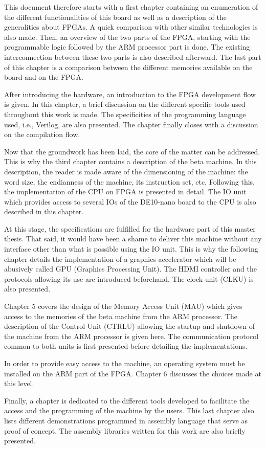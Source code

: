 This document therefore starts with a first chapter containing an enumeration of the different 
functionalities of this board as well as a description of the generalities about FPGAs. A quick 
comparison with other similar technologies is also made. Then, an overview of the two parts of the 
FPGA, starting with the programmable logic followed by the ARM processor part is done. The existing 
interconnection between these two parts is also described afterward. The last part of this chapter 
is a comparison between the different memories available on the board and on the FPGA.

After introducing the hardware, an introduction to the FPGA development flow is 
given. In this chapter, a brief discussion on the different specific tools used throughout this work 
is made. The specificities of the programming language used, i.e., Verilog, are also presented. The
chapter finally closes with a discussion on the compilation flow.

Now that the groundwork has been laid, the core of the matter can be addressed. This is why the 
third chapter contains a description of the beta machine. In this description, the reader is 
made aware of the dimensioning of the machine: the word size, the endianness of the machine, its 
instruction set, etc. Following this, the implementation of the CPU on FPGA is presented in detail. 
The IO unit which provides access to several IOs of the DE10-nano board to the CPU is also
described in this chapter.

At this stage, the specifications are fulfilled for the hardware part of this master thesis. That
said, it would have been a shame to deliver this machine without any interface other than what is 
possible using the IO unit. This is why the following chapter details the implementation of a 
graphics accelerator which will be abusively called GPU (Graphics Processing Unit). The HDMI controller and the protocols 
allowing its use are introduced beforehand. The clock unit (CLKU) is also presented.

Chapter 5 covers the design of the Memory Access Unit (MAU) which gives access to the memories of 
the beta machine from the ARM processor. The description of the Control Unit (CTRLU) allowing the 
startup and shutdown of the machine from the ARM processor is given here. The communication 
protocol common to both units is first presented before detailing the implementations. 

In order to provide easy access to the machine, an operating system must be installed on the ARM 
part of the FPGA. Chapter 6 discusses the choices made at this level.

Finally, a chapter is dedicated to the different tools developed to facilitate the access and the 
programming of the machine by the users. This last chapter also lists different demonstrations 
programmed in assembly language that serve as proof of concept. The assembly libraries written for 
this work are also briefly presented.

